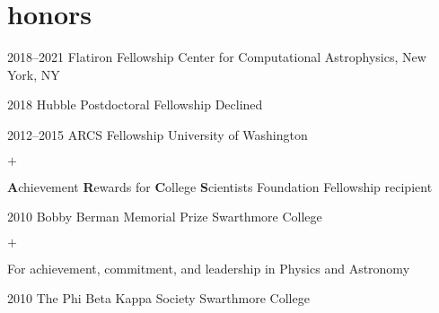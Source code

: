 \documentclass[]{luger-cv} %
\begin{document}



\section{honors}

\begin{entrylist}

\entry
{2018--2021}
{Flatiron Fellowship}
{Center for Computational Astrophysics, New York, NY}
{%
}


\entry
{2018}
{Hubble Postdoctoral Fellowship}
{Declined}
{%
}


\entry
{2012--2015}
{ARCS Fellowship}
{University of Washington}
{%
\vspace{-1em}
\begin{list}{$+$}{\cvlist}
\item \textbf{A}chievement \textbf{R}ewards for \textbf{C}ollege \textbf{S}cientists
Foundation Fellowship recipient
\end{list}
}


\entry
{2010}
{Bobby Berman Memorial Prize}
{Swarthmore College}
{%
\vspace{-1em}
\begin{list}{$+$}{\cvlist}
\item For achievement, commitment, and
leadership in Physics and Astronomy
\end{list}
}


\ifdefined \onepage \else
\entry
{2010}
{The Phi Beta Kappa Society}
{Swarthmore College}
{}
\fi


\end{entrylist}
\end{document}
